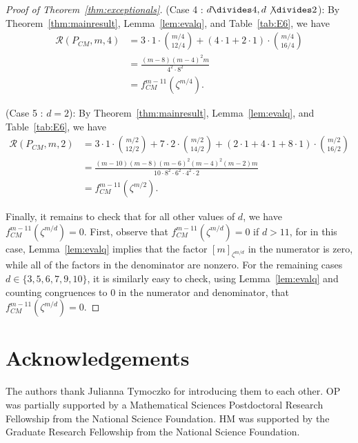 \documentclass[12pt]{amsart}
\theoremstyle{definition}
\theoremstyle{remark}
\numberwithin{equation}{section}
\begin{document}
\begin{proof}[Proof of Theorem~\ref{thm:exceptionals}]
\smallskip
\noindent
{\sf (Case 4 : $d \divides 4, d \not \divides 2$)}:
By Theorem~\ref{thm:mainresult}, Lemma~\ref{lem:evalq}, and Table~\ref{tab:E6}, we have
\begin{align*}
\mathcal{R}(P_{CM},m,4) &= 3 \cdot 1 \cdot \binom{m/4}{12/4} + (4 \cdot 1 + 2 \cdot 1) \cdot \binom{m/4}{16/4}  \\
&= \frac{(m-8)(m-4)^2m}{4^2 \cdot 8^2} \\
&= f_{CM}^{m-11}(\zeta^{m/4}).
\end{align*}

\smallskip
\noindent
{\sf (Case 5 : $d = 2$)}:
By Theorem~\ref{thm:mainresult}, Lemma~\ref{lem:evalq}, and Table~\ref{tab:E6}, we have
\begin{align*}
\mathcal{R}(P_{CM},m,2) &= 3 \cdot 1 \cdot \binom{m/2}{12/2} + 7 \cdot 2 \cdot \binom{m/2}{14/2} + (2 \cdot 1 + 4 \cdot 1 + 8 \cdot 1) \cdot \binom{m/2}{16/2} \\
&= \frac{(m-10)(m-8)(m-6)^2(m-4)^2(m-2)m}{10 \cdot 8^2 \cdot 6^2 \cdot  4^2 \cdot 2}\\
&= f_{CM}^{m-11}(\zeta^{m/2}).
\end{align*}

Finally, it remains to check that for all other values of $d$, we have $f^{m-11}_{CM}(\zeta^{m/d}) = 0$.  First, observe that $f^{m-11}_{CM}(\zeta^{m/d}) = 0$ if $d > 11$, for in this case, Lemma~\ref{lem:evalq} implies that the factor $[m]_{\zeta^{m/d}}$ in the numerator is zero, while all of the factors in the denominator are nonzero. 
For the remaining cases $d \in \{3,5,6,7,9,10 \}$, it is similarly easy to check, using Lemma~\ref{lem:evalq} and counting congruences to $0$ in the numerator and denominator, that $f^{m-11}_{CM}(\zeta^{m/d}) = 0$. 
\end{proof}

\section*{Acknowledgements}
The authors thank Julianna Tymoczko for introducing them to each other. OP was partially supported by a Mathematical Sciences Postdoctoral Research Fellowship from the National Science Foundation. HM was supported by the Graduate Research Fellowship from the National Science Foundation. 


%
%


 

\end{document}
